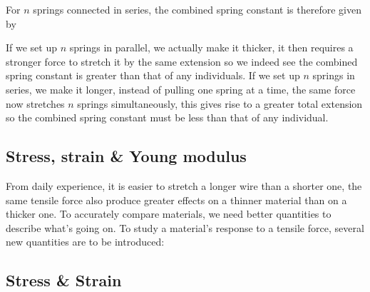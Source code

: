 \documentclass[a4paper,12pt]{book}
\renewenvironment{marginfigure}[1][]{\begin{figure}[htbp]\centering}{\end{figure}}
\newcommand{\tcbhighmath}[1]{\boxed{#1}}
\begin{document}
For $n$ springs connected in series, the combined spring constant is therefore given by

If we set up $n$ springs in parallel, we actually make it thicker, it then requires a stronger force to stretch it by the same extension so we indeed see the combined spring constant is greater than that of any individuals. If we set up $n$ springs in series, we make it longer, instead of pulling one spring at a time, the same force now stretches $n$ springs simultaneously, this gives rise to a greater total extension so the combined spring constant must be less than that of any individual.

\begin{marginfigure}
	\vspace*{-5pt}
	\centering
	\vspace*{-16pt}
\end{marginfigure}

\subsection{Stress, strain \& Young modulus}

From daily experience, it is easier to stretch a longer wire than a shorter one, the same tensile force also produce greater effects on a thinner material than on a thicker one. To accurately compare materials, we need better quantities to describe what's going on. To study a material's response to a tensile force, several new quantities are to be introduced:

\subsection{Stress \& Strain}
\end{document}
